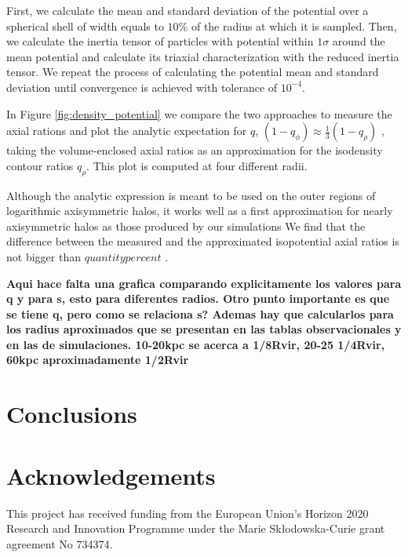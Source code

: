 \documentclass[a4paper,fleqn,usenatbib]{mnras}
\begin{document}
First, we calculate the mean and standard deviation of the potential over a
spherical shell of width equals to $10\%$ of the radius at which it is
sampled. 
Then, we calculate the inertia tensor of particles with potential
within $1\sigma$ around the mean potential and calculate its triaxial
characterization with the reduced inertia tensor. 
We repeat the
process of calculating the potential mean and standard deviation until
convergence is achieved with tolerance of $10^{-4}$. 

In Figure \ref{fig:density_potential} we compare the two approaches to
measure the axial rations and plot the analytic expectation for $q$, 
$(1-q_{\phi})\approx \frac{1}{3}(1-q_{\rho})$
\citep{Binney_and_Tremaine_2008}, taking the volume-enclosed axial
ratios  as an approximation for the isodensity contour ratios
$q_{\rho}$. 
This plot is computed at four different radii.

Although the analytic expression is meant to be used on the outer
regions of logarithmic axisymmetric halos, it works well as a first
approximation for nearly axisymmetric halos as those produced by our
simulations 
We find that the difference between the measured and the
approximated isopotential axial ratios is not bigger than $quantity
percent$ {\bf }. 


{\bf Aqui hace falta una grafica comparando explicitamente los
  valores para q y para s, esto para diferentes radios.
  Otro punto importante es que se tiene q, pero como se
  relaciona s?
  Ademas hay que calcularlos para los radius aproximados que se
  presentan en las tablas observacionales y en las de simulaciones.
  10-20kpc se acerca a 1/8Rvir, 20-25 1/4Rvir, 60kpc aproximadamente 1/2Rvir
}



\section{Conclusions}


\section*{Acknowledgements}
This project has received funding from the European Union's Horizon
2020 Research and Innovation Programme under the Marie
Sk\l{}odowska-Curie grant agreement No 734374. 

 
 
\end{document}
